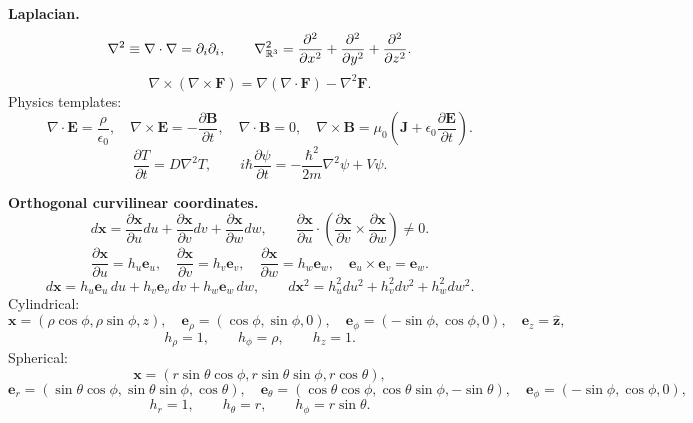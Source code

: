 \noindent\textbf{Laplacian.}
\[
\nabla^2\equiv\nabla\cdot\nabla=\partial_i\partial_i,\qquad
\nabla^2_{\mathbb{R}^3}=
\frac{\partial^2}{\partial x^2}
+\frac{\partial^2}{\partial y^2}
+\frac{\partial^2}{\partial z^2}.
\]
\[
\nabla\times(\nabla\times\mathbf{F})
=\nabla(\nabla\cdot\mathbf{F})-\nabla^2\mathbf{F}.
\]
Physics templates:
\[
\nabla\cdot\mathbf{E}=\frac{\rho}{\epsilon_0},\quad
\nabla\times\mathbf{E}=-\frac{\partial\mathbf{B}}{\partial t},\quad
\nabla\cdot\mathbf{B}=0,\quad
\nabla\times\mathbf{B}=\mu_0\left(\mathbf{J}
+\epsilon_0\frac{\partial\mathbf{E}}{\partial t}\right).
\]
\[
\frac{\partial T}{\partial t}=D\nabla^2T,\qquad
i\hbar\frac{\partial\psi}{\partial t}
=-\frac{\hbar^2}{2m}\nabla^2\psi+V\psi.
\]

\noindent\textbf{Orthogonal curvilinear coordinates.}
\[
d\mathbf{x}
=\frac{\partial\mathbf{x}}{\partial u}du
+\frac{\partial\mathbf{x}}{\partial v}dv
+\frac{\partial\mathbf{x}}{\partial w}dw,
\qquad
\frac{\partial\mathbf{x}}{\partial u}\cdot
\left(\frac{\partial\mathbf{x}}{\partial v}\times
\frac{\partial\mathbf{x}}{\partial w}\right)\ne0.
\]
\[
\frac{\partial\mathbf{x}}{\partial u}=h_u\mathbf{e}_u,\quad
\frac{\partial\mathbf{x}}{\partial v}=h_v\mathbf{e}_v,\quad
\frac{\partial\mathbf{x}}{\partial w}=h_w\mathbf{e}_w,\quad
\mathbf{e}_u\times\mathbf{e}_v=\mathbf{e}_w.
\]
\[
d\mathbf{x}=h_u\mathbf{e}_u\,du+h_v\mathbf{e}_v\,dv+h_w\mathbf{e}_w\,dw,
\qquad
d\mathbf{x}^2=h_u^2du^2+h_v^2dv^2+h_w^2dw^2.
\]
Cylindrical:
\[
\mathbf{x}=(\rho\cos\phi,\rho\sin\phi,z),\quad
\mathbf{e}_\rho=(\cos\phi,\sin\phi,0),\quad
\mathbf{e}_\phi=(-\sin\phi,\cos\phi,0),\quad
\mathbf{e}_z=\hat{\mathbf{z}},
\]
\[
h_\rho=1,\qquad h_\phi=\rho,\qquad h_z=1.
\]
Spherical:
\[
\mathbf{x}=(r\sin\theta\cos\phi,r\sin\theta\sin\phi,r\cos\theta),
\]
\[
\mathbf{e}_r=(\sin\theta\cos\phi,\sin\theta\sin\phi,\cos\theta),
\quad
\mathbf{e}_\theta=(\cos\theta\cos\phi,\cos\theta\sin\phi,-\sin\theta),
\quad
\mathbf{e}_\phi=(-\sin\phi,\cos\phi,0),
\]
\[
h_r=1,\qquad h_\theta=r,\qquad h_\phi=r\sin\theta.
\]

